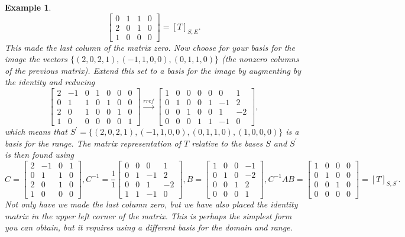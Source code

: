 \documentclass[10pt]{article}
\theoremstyle{plain}
\theoremstyle{box}
\newtheorem{example}{Example}
\begin{document}
\begin{example}
$$\begin{bmatrix}
 0 & 1 & 1 & 0 \\
 2 & 0 & 1 & 0 \\
 1 & 0 & 0 & 0
\end{bmatrix} = [T]_{S,E}.$$ This made the last column of the matrix zero. 
Now choose for your basis for the image the vectors $\{(2,0,2,1),(-1,1,0,0),(0,1,1,0)\}$ (the nonzero columns of the previous matrix). Extend this set to a basis for the image by augmenting by the identity and reducing
$$\begin{bmatrix}
 2 & -1 & 0 & 1 & 0 & 0 & 0 \\
 0 & 1 & 1 & 0 & 1 & 0 & 0 \\
 2 & 0 & 1 & 0 & 0 & 1 & 0 \\
 1 & 0 & 0 & 0 & 0 & 0 & 1
\end{bmatrix}
\xrightarrow{rref}
\begin{bmatrix}
 1 & 0 & 0 & 0 & 0 & 0 & 1 \\
 0 & 1 & 0 & 0 & 1 & -1 & 2 \\
 0 & 0 & 1 & 0 & 0 & 1 & -2 \\
 0 & 0 & 0 & 1 & 1 & -1 & 0
\end{bmatrix},
$$ which means that $S^\prime = \{(2,0,2,1),(-1,1,0,0),(0,1,1,0),(1,0,0,0)\}$ is a basis for the range. 
 The matrix representation of $T$ relative to the bases $S$ and $S^\prime$ is then found using 
$$C=
\begin{bmatrix}
 2 & -1 & 0 & 1 \\
 0 & 1 & 1 & 0 \\
 2 & 0 & 1 & 0 \\
 1 & 0 & 0 & 0
\end{bmatrix},
C^{-1} = \frac{1}{1}
\begin{bmatrix}
 0 & 0 & 0 & 1 \\
 0 & 1 & -1 & 2 \\
 0 & 0 & 1 & -2 \\
 1 & 1 & -1 & 0
\end{bmatrix},
B=
\begin{bmatrix}
 1 & 0 & 0 & -1 \\
 0 & 1 & 0 & -2 \\
 0 & 0 & 1 & 2 \\
 0 & 0 & 0 & 1
\end{bmatrix},
C^{-1}AB= 
\begin{bmatrix}
 1 & 0 & 0 & 0 \\
 0 & 1 & 0 & 0 \\
 0 & 0 & 1 & 0 \\
 0 & 0 & 0 & 0
\end{bmatrix} = [T]_{S,S^\prime}.$$ Not only have we made the last column zero, but we have also placed the identity matrix in the upper left corner of the matrix. This is perhaps the simplest form you can obtain, but it requires using a different basis for the domain and range.




\end{example}
\end{document}

